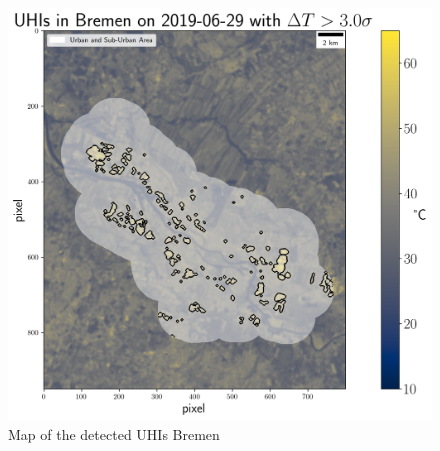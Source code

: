 \documentclass[12pt,a4paper, english,twoside]{scrartcl}
\begin{document}
       \begin{figure}[!hbtp]
          \includegraphics[width=\textwidth]{img/UHIs_Bremen_2019-06-29_s:3}
         \caption{Map of the detected UHIs Bremen}\label{fig:uhisHB2019}
       \end{figure}
\end{document}
